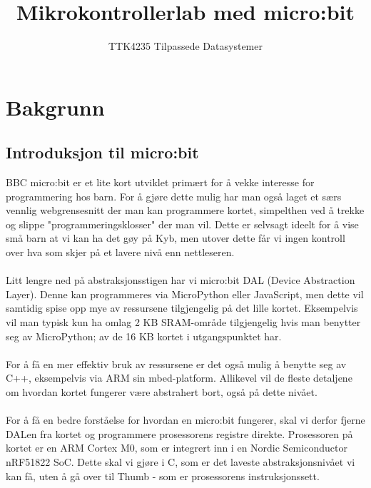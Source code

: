 \documentclass[11pt,a4paper]{article}
\title{Mikrokontrollerlab med micro:bit}
\author{TTK4235 Tilpassede Datasystemer}
\date{}
\begin{document}
\maketitle
\section{Bakgrunn}
\subsection{Introduksjon til micro:bit}
BBC micro:bit er et lite kort utviklet primært for å vekke interesse for programmering hos barn. For å gjøre dette mulig har man også laget et særs vennlig webgrensesnitt der man kan programmere kortet, simpelthen ved å trekke og slippe "programmeringsklosser" der man vil. Dette er selvsagt ideelt for å vise små barn at vi kan ha det gøy på Kyb, men utover dette får vi ingen kontroll over hva som skjer på et lavere nivå enn nettleseren.\\
\\
Litt lengre ned på abstraksjonsstigen har vi micro:bit DAL (Device Abstraction Layer). Denne kan programmeres via MicroPython eller JavaScript, men dette vil samtidig spise opp mye av ressursene tilgjengelig på det lille kortet. Eksempelvis vil man typisk kun ha omlag 2 KB SRAM-område tilgjengelig hvis man benytter seg av MicroPython; av de 16 KB kortet i utgangspunktet har.\\
\\
For å få en mer effektiv bruk av ressursene er det også mulig å benytte seg av C++, eksempelvis via ARM sin mbed-platform. Allikevel vil de fleste detaljene om hvordan kortet fungerer være abstrahert bort, også på dette nivået.\\
\\
For å få en bedre forståelse for hvordan en micro:bit fungerer, skal vi derfor fjerne DALen fra kortet og programmere prosessorens registre direkte. Prosessoren på kortet er en ARM Cortex M0, som er integrert inn i en Nordic Semiconductor nRF51822 SoC. Dette skal vi gjøre i C, som er det laveste abstraksjonsnivået vi kan få, uten å gå over til Thumb - som er prosessorens instruksjonssett.
\end{document}
